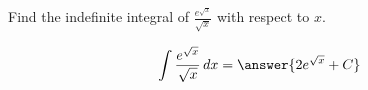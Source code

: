 \documentclass{ximera}
\author{Gregory Hartman \and Matthew Carr}
\begin{document}
\begin{exercise}

Find the indefinite integral of $\frac{e^{\sqrt{x}}}{\sqrt{x}}$ with respect to $x$.

\[
\int \frac{e^{\sqrt{x}}}{\sqrt{x}}\d x=\answer{2e^{\sqrt{x}}+C}
\]

\end{exercise}
\end{document}
